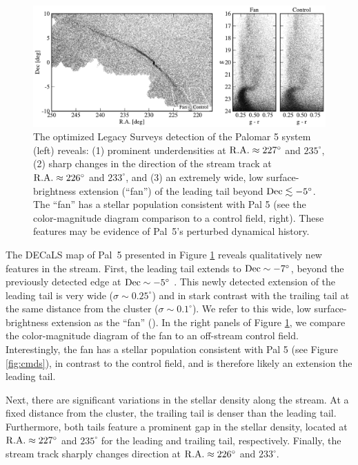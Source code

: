 \documentclass[twocolumn]{aastex62}
\newcommand{\sa}[1]{{\color{magenta} SP: #1}}
\begin{document}
\begin{figure}
\begin{center}
\includegraphics[width=\textwidth]{map_fancmd.pdf}
\end{center}
\caption{
The optimized Legacy Surveys detection of the Palomar 5 system (left) reveals: (1) prominent underdensities at $\rm R.A.\approx 227^\circ$ and $235^\circ$, (2) sharp changes in the direction of the stream track at $\rm R.A.\approx 226^\circ$ and $233^\circ$, and (3) an extremely wide, low surface-brightness extension (``fan'') of the leading tail beyond $\rm Dec\lesssim-5^\circ$. The ``fan''  has a stellar population consistent with Pal 5 (see the color-magnitude diagram comparison to a control field, right).
These features may be evidence of Pal~5's perturbed dynamical history.
}
\label{fig:map}
\end{figure}

The DECaLS map of Pal~5 presented in Figure \ref{fig:map} reveals qualitatively new features in the stream.
First, the leading tail extends to $\rm Dec\sim-7^\circ$, beyond the previously detected edge at $\rm Dec\sim -5^\circ$ \citep{Bernard:2016}.
This newly detected extension of the leading tail is very wide ($\sigma\sim 0.25^\circ$) and in stark contrast with the trailing tail at the same distance from the cluster ($\sigma\sim 0.1^\circ$). We refer to this wide, low surface-brightness extension as the ``fan'' (\citealt{Pearson:2015}). In the right panels of Figure \ref{fig:map}, we compare the color-magnitude diagram of the fan to an off-stream control field. Interestingly, the fan has a stellar population consistent with Pal 5 (see Figure \ref{fig:cmds}), in contrast to the control field, and is therefore likely an extension the leading tail.

Next, there are significant variations in the stellar density along the stream.
At a fixed distance from the cluster, the trailing tail is denser than the leading tail.
Furthermore, both tails feature a prominent gap in the stellar density, located at $\rm R.A.\approx 227^\circ$ and $235^\circ$ for the leading and trailing tail, respectively.
Finally, the stream track sharply changes direction at $\rm R.A.\approx 226^\circ$ and $233^\circ$.
\end{document}
